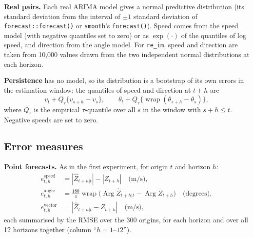 \documentclass[11pt,a4paper]{article}
\newcommand{\code}[1]{\texttt{#1}}
\DeclareMathOperator{\Arg}{Arg}
\DeclareMathOperator{\wrap}{wrap}
\newcommand{\1}{\mathbf{1}}
\begin{document}
\textbf{Real pairs.} Each real ARIMA model gives a normal predictive distribution (its standard
deviation from the interval of $\pm 1$ standard deviation of \code{forecast::forecast()} or
\code{smooth}'s \code{forecast()}). Speed comes from the speed model (with negative quantiles set to
zero) or as $\exp(\cdot)$ of the quantiles of log speed, and direction from the angle model. For
\code{re\_im}, speed and direction are taken from 10,000 values drawn from the two independent
normal distributions at each horizon.

\textbf{Persistence} has no model, so its distribution is a bootstrap of its own errors in the
estimation window: the quantiles of speed and direction at $t + h$ are
\begin{equation}
  v_t + Q_\tau\{v_{s+h} - v_s\}, \qquad
  \theta_t + Q_\tau\{\wrap(\theta_{s+h} - \theta_s)\},
\end{equation}
where $Q_\tau$ is the empirical $\tau$-quantile over all $s$ in the window with $s + h \le t$.
Negative speeds are set to zero.

\subsection{Error measures}\label{sec:measures}

\textbf{Point forecasts.} As in the first experiment, for origin $t$ and horizon $h$:
\begin{align}
  e^{\text{speed}}_{t,h} &= |\hat Z_{t+h|t}| - |Z_{t+h}| \quad \text{(m/s)}, \\
  e^{\text{angle}}_{t,h} &= \tfrac{180}{\pi}\wrap\bigl(\Arg\hat Z_{t+h|t} - \Arg Z_{t+h}\bigr)
    \quad \text{(degrees)}, \\
  e^{\text{vector}}_{t,h} &= |\hat Z_{t+h|t} - Z_{t+h}| \quad \text{(m/s)},
\end{align}
each summarised by the RMSE over the 300 origins, for each horizon and over all 12 horizons
together (column ``$h = 1$--$12$'').
\end{document}
